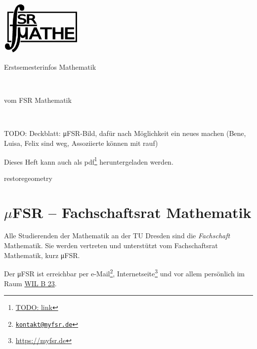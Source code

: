 \documentclass{scrartcl}
\begin{document}
\newcommand{\keyword}{\emph}
\newcommand{\todo}[1]{\marginpar{TODO\\#1}}
\newpage
{ 
  \thispagestyle{empty} %
  \begin{flushright}
    \includegraphics[width=0.3\textwidth]{./fsrlogos/bw_1024.png}
  \end{flushright}
  \begin{center}
    \begin{huge}
      Erstsemesterinfos Mathematik
    \end{huge}\\\bigskip
    \begin{Large}
      vom FSR Mathematik
    \end{Large}\\\bigskip
  \end{center}
  TODO: Deckblatt: μFSR-Bild, dafür nach Möglichkeit ein neues machen (Bene, Luisa, Felix sind weg, Assoziierte können mit rauf) 
  \vfill
  \begin{small}
    Dieses Heft kann auch als pdf\footnote{\url{TODO: link}} heruntergeladen werden.
  \end{small}
  \newpage
}
restoregeometry %
\pagestyle{plain}
\section*{\texorpdfstring{$\mu$}{my}FSR -- Fachschaftsrat Mathematik}
Alle Studierenden der Mathematik an der TU Dresden sind die \keyword{Fachschaft} Mathematik.
Sie werden vertreten und unterstützt vom Fachschaftsrat Mathematik, kurz μFSR.

Der μFSR ist erreichbar per e-Mail\footnote{\href{mailto:kontakt@myfsr.de}{\nolinkurl{kontakt@myfsr.de}}},
Internetseite\footnote{\url{https://myfsr.de}} und vor allem persönlich im Raum
\href{https://navigator.tu-dresden.de/etplan/wil/-1/raum/2193-1.0170}{WIL B 23}.
\end{document}
